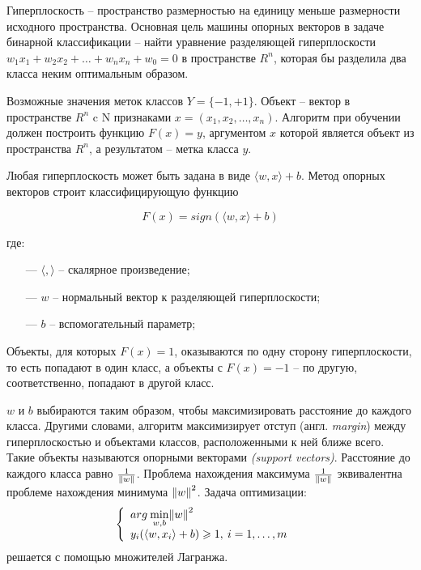 Гиперплоскость -- пространство размерностью на единицу меньше размерности исходного пространства.
Основная цель машины опорных векторов в задаче бинарной классификации -- найти уравнение разделяющей гиперплоскости $w_1x_1+w_2x_2+…+w_nx_n+w_0=0$
в пространстве $R^n$, которая бы разделила два класса неким оптимальным образом.

Возможные значения меток классов $Y = \{-1, +1\}$. Объект -- вектор в пространстве $R^n$ c
N признаками $x = (x_1, x_2, \dots, x_n)$. Алгоритм при обучении должен построить функцию
$F(x)=y$, аргументом $x$ которой является объект из пространства $R^n$, а результатом -- метка класса $y$.

Любая гиперплоскость может быть задана в виде $\langle w, x \rangle + b$.
Метод опорных векторов строит классифицирующую функцию

\begin{equation}\label{eq5}
    F(x) = sign(\langle w, x \rangle + b)
\end{equation}

где:
\begin{itemize}
    \item[—] $\langle , \rangle$ -- скалярное произведение;
    \item[—] $w$ -- нормальный вектор к разделяющей гиперплоскости;
    \item[—] $b$ -- вспомогательный параметр;
\end{itemize}

Объекты, для которых $F(x) = 1$, оказываются по одну сторону гиперплоскости,
то есть попадают в один класс, а объекты с $F(x) = -1$ -- по другую, соответственно,
попадают в другой класс.

$w$ и $b$ выбираются таким образом, чтобы максимизировать расстояние до каждого класса.
Другими словами, алгоритм максимизирует отступ (англ. \emph{margin}) между гиперплоскостью
и объектами классов, расположенными к ней ближе всего. Такие объекты называются опорными векторами \emph{(support vectors)}.
Расстояние до каждого класса равно $\frac {1}{\Arrowvert w \Arrowvert}$. Проблема нахождения максимума
$\frac {1}{\Arrowvert w \Arrowvert}$ эквивалентна проблеме нахождения минимума ${\Arrowvert w \Arrowvert}^2$.
Задача оптимизации:
\begin{equation}\label{eq6}
    \left\{ \begin{array}{ll} arg \: \underset{w,b}{\min} {\Arrowvert w \Arrowvert}^2 & \textrm{}\\ y_i(\langle w,x_i \rangle + b) \geqslant 1, \: i = 1, \dots, m \end{array} \right.
\end{equation}
решается с помощью множителей Лагранжа.


